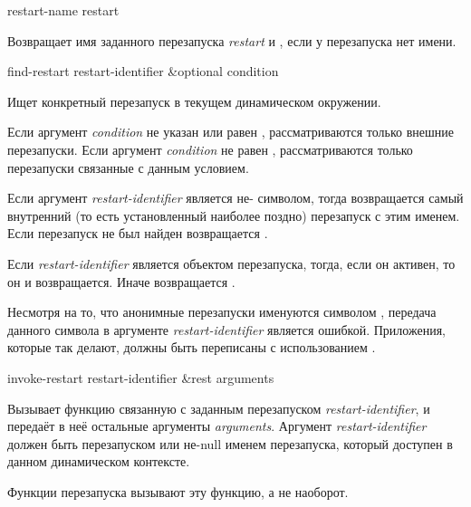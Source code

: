 \begin{defun}[Функция]
restart-name restart

Возвращает имя заданного перезапуска \emph{restart} и , если у
перезапуска нет имени.
\end{defun}

\begin{defun}[Функция]
find-restart restart-identifier &optional condition

Ищет конкретный перезапуск в текущем динамическом окружении.

Если аргумент \emph{condition} не указан или равен , рассматриваются
только внешние перезапуски. Если аргумент \emph{condition} не равен ,
рассматриваются только перезапуски связанные с данным условием.

Если аргумент \emph{restart-identifier} является не- символом, тогда
возвращается самый внутренний (то есть установленный наиболее поздно) перезапуск
с этим именем. Если перезапуск не был найден возвращается .

Если \emph{restart-identifier} является объектом перезапуска, тогда, если он
активен, то он и возвращается. Иначе возвращается .

Несмотря на то, что анонимные перезапуски именуются символом , передача
данного символа в аргументе \emph{restart-identifier} является
ошибкой. Приложения, которые так делают, должны быть переписаны с использованием
.
\end{defun}

\begin{defun}[Функция]
invoke-restart restart-identifier &rest arguments

Вызывает функцию связанную с заданным перезапуском \emph{restart-identifier}, и
передаёт в неё остальные аргументы \emph{arguments}. Аргумент
\emph{restart-identifier} должен быть перезапуском или не-null именем
перезапуска, который доступен в данном динамическом контексте.

\beforenoterule
\begin{implementation} 
Функции перезапуска вызывают эту функцию, а не наоборот.
\end{implementation} 
\afternoterule
\end{defun}

